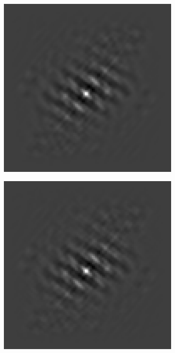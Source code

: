 \begin{figure}[htpb]
\centering
\begin{subfigure}{.25\textwidth}
\includegraphics[width=1\textwidth]{img/GCsigma0}
\end{subfigure}%
\begin{subfigure}{.25\textwidth}
\includegraphics[width=1\textwidth]{img/GCsigma75}

\end{subfigure}
\end{figure}
